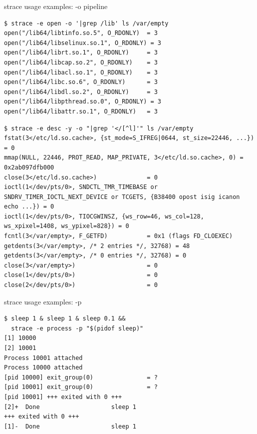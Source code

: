 \documentclass[unicode,aspectratio=169]{beamer}
\begin{document}
\begin{frame}[fragile]{strace usage examples: -o pipeline}
\scriptsize
\begin{verbatim}
$ strace -e open -o '|grep /lib' ls /var/empty
open("/lib64/libtinfo.so.5", O_RDONLY)  = 3
open("/lib64/libselinux.so.1", O_RDONLY) = 3
open("/lib64/librt.so.1", O_RDONLY)     = 3
open("/lib64/libcap.so.2", O_RDONLY)    = 3
open("/lib64/libacl.so.1", O_RDONLY)    = 3
open("/lib64/libc.so.6", O_RDONLY)      = 3
open("/lib64/libdl.so.2", O_RDONLY)     = 3
open("/lib64/libpthread.so.0", O_RDONLY) = 3
open("/lib64/libattr.so.1", O_RDONLY)   = 3
\end{verbatim}

\begin{verbatim}
$ strace -e desc -y -o "|grep '</[^l]'" ls /var/empty
fstat(3</etc/ld.so.cache>, {st_mode=S_IFREG|0644, st_size=22446, ...}) = 0
mmap(NULL, 22446, PROT_READ, MAP_PRIVATE, 3</etc/ld.so.cache>, 0) = 0x2ab097dfb000
close(3</etc/ld.so.cache>)              = 0
ioctl(1</dev/pts/0>, SNDCTL_TMR_TIMEBASE or SNDRV_TIMER_IOCTL_NEXT_DEVICE or TCGETS, {B38400 opost isig icanon echo ...}) = 0
ioctl(1</dev/pts/0>, TIOCGWINSZ, {ws_row=46, ws_col=128, ws_xpixel=1408, ws_ypixel=828}) = 0
fcntl(3</var/empty>, F_GETFD)           = 0x1 (flags FD_CLOEXEC)
getdents(3</var/empty>, /* 2 entries */, 32768) = 48
getdents(3</var/empty>, /* 0 entries */, 32768) = 0
close(3</var/empty>)                    = 0
close(1</dev/pts/0>)                    = 0
close(2</dev/pts/0>)                    = 0
\end{verbatim}
\end{frame}

\begin{frame}[fragile]{strace usage examples: -p}
\begin{verbatim}
$ sleep 1 & sleep 1 & sleep 0.1 &&
  strace -e process -p "$(pidof sleep)"
[1] 10000
[2] 10001
Process 10001 attached
Process 10000 attached
[pid 10000] exit_group(0)               = ?
[pid 10001] exit_group(0)               = ?
[pid 10001] +++ exited with 0 +++
[2]+  Done                    sleep 1
+++ exited with 0 +++
[1]-  Done                    sleep 1

\end{verbatim}
\end{frame}
\end{document}

